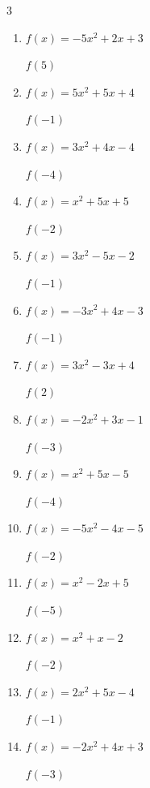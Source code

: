 \begin{multicols}{3}
\begin{enumerate}
  \item $f(x)=-5x^{2}+2x+3$

$f(5)$
        \phantom{$= -112$}

  \item $f(x)=5x^{2}+5x+4$

$f(-1)$
        \phantom{$= 4$}

  \item $f(x)=3x^{2}+4x-4$

$f(-4)$
        \phantom{$= 28$}

  \item $f(x)=x^{2}+5x+5$

$f(-2)$
        \phantom{$= -1$}

\columnbreak %

  \item $f(x)=3x^{2}-5x-2$

$f(-1)$
        \phantom{$= 6$}

  \item $f(x)=-3x^{2}+4x-3$

$f(-1)$
        \phantom{$= -10$}

  \item $f(x)=3x^{2}-3x+4$

$f(2)$
        \phantom{$= 10$}

  \item $f(x)=-2x^{2}+3x-1$

$f(-3)$
        \phantom{$= -28$}

  \item $f(x)=x^{2}+5x-5$

$f(-4)$
        \phantom{$= -9$}

  \item $f(x)=-5x^{2}-4x-5$

$f(-2)$
        \phantom{$= -17$}

  \item $f(x)=x^{2}-2x+5$

$f(-5)$
        \phantom{$= 40$}

  \item $f(x)=x^{2}+x-2$

$f(-2)$
        \phantom{$= 0$}

  \item $f(x)=2x^{2}+5x-4$

$f(-1)$
        \phantom{$= -7$}

  \item $f(x)=-2x^{2}+4x+3$

$f(-3)$
        \phantom{$= -27$}


\end{enumerate}
\end{multicols}
